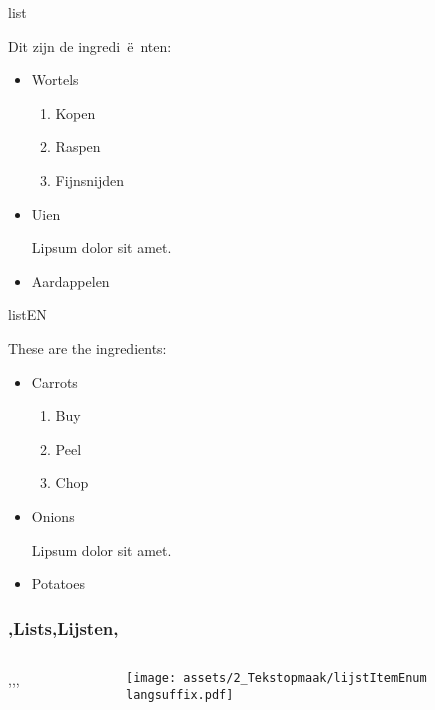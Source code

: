 
\begin{saveblock}{list}
    \begin{highlightblock}[linewidth=0.5\textwidth,gobble=12]
        Dit zijn de ingredi~\"e~nten:
        \begin{itemize}
            \item Wortels
            \begin{enumerate}
                \item Kopen
                \item Raspen
                \item Fijnsnijden
            \end{enumerate}			
            \item Uien
            
            Lipsum dolor sit amet.
            \item Aardappelen
        \end{itemize}
    \end{highlightblock}
\end{saveblock}

\begin{saveblock}{listEN}
    \begin{highlightblock}[linewidth=0.5\textwidth,gobble=12]
        These are the ingredients:
        \begin{itemize}
            \item Carrots
            \begin{enumerate}
                \item Buy
                \item Peel
                \item Chop
            \end{enumerate}
            \item Onions
            
            Lipsum dolor sit amet.
            \item Potatoes
        \end{itemize}
    \end{highlightblock}
\end{saveblock}

\begin{frame}
    \frametitle{\lang,Lists,Lijsten,}
    
    \begin{columns}
        \begin{column}{0.5\textwidth}
            \lang,,,
        \end{column}
        \begin{column}{0.5\textwidth}
            \texttt{[image: assets/2\_Tekstopmaak/lijstItemEnum\\langsuffix.pdf]}
        \end{column}
    \end{columns}
\end{frame}

